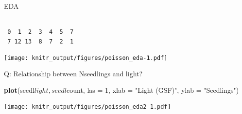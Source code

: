 \documentclass[10pt,ignorenonframetext,]{beamer}
\newenvironment{Shaded}{\begin{snugshade}}{\end{snugshade}}
\newcommand{\KeywordTok}[1]{\textcolor[rgb]{0.13,0.29,0.53}{\textbf{{#1}}}}
\newcommand{\DataTypeTok}[1]{\textcolor[rgb]{0.13,0.29,0.53}{{#1}}}
\newcommand{\DecValTok}[1]{\textcolor[rgb]{0.00,0.00,0.81}{{#1}}}
\newcommand{\StringTok}[1]{\textcolor[rgb]{0.31,0.60,0.02}{{#1}}}
\newcommand{\NormalTok}[1]{{#1}}
\begin{document}
\begin{frame}[fragile]{EDA}

\begin{Shaded}
\end{Shaded}

\begin{verbatim}

 0  1  2  3  4  5  7 
 7 12 13  8  7  2  1 
\end{verbatim}

\begin{Shaded}
\end{Shaded}

\texttt{[image: knitr\_output/figures/poisson\_eda-1.pdf]}

\end{frame}

\begin{frame}[fragile]{Q: Relationship between Nseedlings and light?}

\begin{Shaded}
\begin{Highlighting}[]
\KeywordTok{plot}\NormalTok{(seedl$light, seedl$count, }\DataTypeTok{las =} \DecValTok{1}\NormalTok{, }\DataTypeTok{xlab =} \StringTok{"Light (GSF)"}\NormalTok{, }\DataTypeTok{ylab =} \StringTok{"Seedlings"}\NormalTok{)}
\end{Highlighting}
\end{Shaded}

\texttt{[image: knitr\_output/figures/poisson\_eda2-1.pdf]}

\end{frame}
\end{document}
